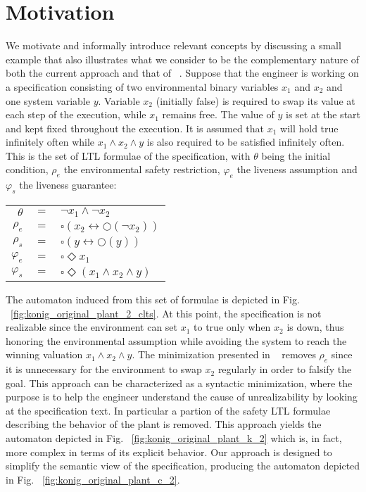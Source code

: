 \section{Motivation}\label{sec:motivation}
We motivate and informally introduce relevant concepts by discussing a small example that also illustrates what we consider to be the complementary nature 
of both the current approach and that of ~\cite{DBLP:conf/hvc/KonighoferHB10}. Suppose that the engineer is working on a specification consisting of two environmental binary variables $x_1$ and $x_2$ and one system variable $y$. Variable $x_2$ (initially false) is required to swap its value at each step of the execution, while $x_1$ remains free. The value of $y$ is set at the start and kept fixed throughout the execution.
It is assumed that $x_1$ will hold true infinitely often while $x_1 \wedge x_2 \wedge y$ is also required to be satisfied infinitely often. This is the set of LTL formulae of the specification, with $\theta$ being the initial condition, $\rho_e$ the environmental safety restriction, $\varphi_e$ the liveness assumption and $\varphi_s$ the liveness guarantee:
\begin{center}
	\begin{tabular}{ r c l }
		$\theta$& $=$ &$\neg x_1 \wedge \neg x_2$\\
		$\rho_e$& $=$ &$\square(x_2 \leftrightarrow \bigcirc(\neg x_2))$\\
		$\rho_s$& $=$ &$\square(y \leftrightarrow \bigcirc(y))$\\		
		$\varphi_e$& $=$ &$\square \Diamond x_1$\\
		$\varphi_s$& $=$ &$\square \Diamond (x_1 \wedge x_2 \wedge y)$\\
	\end{tabular}
\end{center}

The automaton induced from this set of formulae is depicted in Fig. ~\ref{fig:konig_original_plant_2_clts}. At this point, the specification is not realizable since the environment can set $x_1$ to true only when $x_2$ is down, thus honoring the environmental assumption while avoiding the system to reach the winning valuation $x_1 \wedge x_2 \wedge y$. The minimization presented in ~\cite{DBLP:conf/hvc/KonighoferHB10} removes $\rho_e$ since it is unnecessary for the environment to swap $x_2$ regularly in order to falsify the goal. This approach can be characterized as a syntactic minimization, where the purpose is to help the engineer understand the cause of unrealizability by looking at the specification text. In particular a partion of the safety LTL formulae describing the behavior of the plant is removed. This approach yields the automaton depicted in Fig. ~\ref{fig:konig_original_plant_k_2} which is, in fact, more complex in terms of its explicit behavior. Our approach is designed to simplify the semantic view of the specification, producing the automaton depicted in Fig. ~\ref{fig:konig_original_plant_c_2}. 

